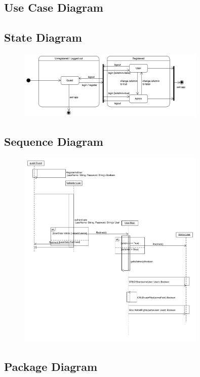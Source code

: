 \subsection{Use Case Diagram}

\subsection{State Diagram}
\begin{figure}[!htbp]
	\includegraphics[width=0.8\textwidth]{User_Management/User_Management_State_Diagram.png}
\end{figure}

\subsection{Sequence Diagram}
\begin{figure}[!htbp]
	\includegraphics[width=0.8\textwidth]{User_Management/Sequence_Diagram_User_Management.png}
\end{figure}

\subsection{Package Diagram}

